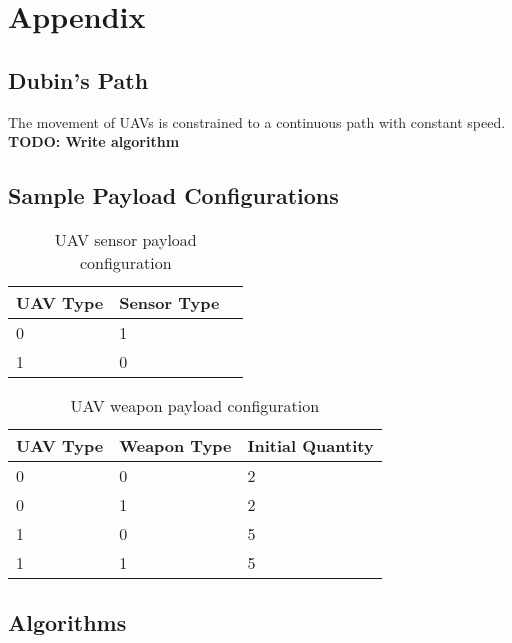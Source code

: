 \chapter{Appendix}


\section{Dubin's Path} \label{sec:dubin}
The movement of UAVs is constrained to a continuous path with constant speed.
\textbf{TODO: Write algorithm}



\section{Sample Payload Configurations}
\label{sec:pyldConfigs}
\begin{table}[H]
	\caption{UAV sensor payload configuration}
	\centering
	\label{tab:uavSensorMap}
	\begin{tabular}{|p{1cm}|p{1cm}|p{1cm}|}
		\hline
		UAV Type & Sensor Type\\ \hline
		0 & 1 \\
		1 & 0 \\
		\hline
	\end{tabular}
\end{table}

\begin{table}[H]
	\caption{UAV weapon payload configuration}
	\centering
	\label{tab:uavWpnMap}
	\begin{tabular}{|p{1cm}|p{1.5cm}|p{2cm}|}
		\hline
		UAV Type & Weapon Type & Initial Quantity\\ \hline
		0 & 0 & 2 \\
		0 & 1 & 2 \\
		1 & 0 & 5 \\
		1 & 1 & 5 \\
		\hline
	\end{tabular}
\end{table}


\section{Algorithms}
\label{sec:algorithms}

